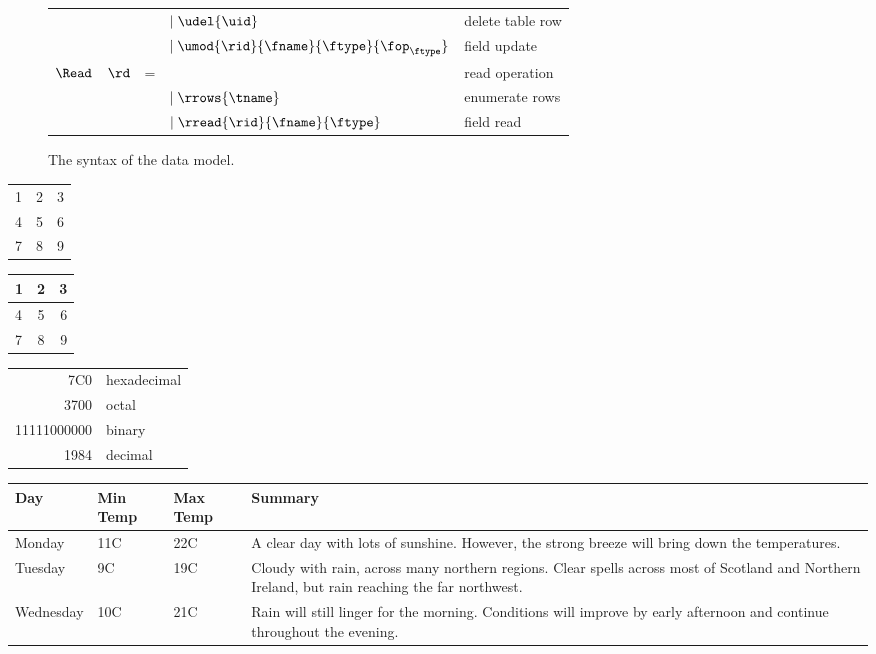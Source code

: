 \begin{figure*}
\begin{center}
\begin{tabular}{lrl@{\hspace{.1in}}l@{\hspace{.1in}}l}
  &   &  & $ \mid \udel{\uid}                    $  & delete table row \\
  &   &  & $\mid \umod{\rid}{\fname}{\ftype}{\fop_\ftype}      $  & field update \\\hline
$\Read$&$\rd$ & =    &                              & read operation \\
  &  &   & $\mid \rrows{\tname}        $           & enumerate rows \\
  &   &  & $\mid \rread {\rid}{\fname}{\ftype} $      & field read  \\\hline\hline
\end{tabular}
\end{center}
\caption{The syntax of the data model.}
\label{fig:datamodel}
\end{figure*}

\begin{tabular}{ l c r }
  1 & 2 & 3 \\
  4 & 5 & 6 \\
  7 & 8 & 9 \\
\end{tabular}

\begin{center}
  \begin{tabular}{ l | c || r }
    \hline
    1 & 2 & 3 \\ \hline
    4 & 5 & 6 \\ \hline
    7 & 8 & 9 \\
    \hline
  \end{tabular}
\end{center}

\begin{tabular}{|r|l|}
  \hline
  7C0 & hexadecimal \\
  3700 & octal \\ \cline{2-2}
  11111000000 & binary \\
  \hline \hline
  1984 & decimal \\
  \hline
\end{tabular}


\begin{center}
    \begin{tabular}{| l | l | l | l |}
    \hline
    Day & Min Temp & Max Temp & Summary \\ \hline
    Monday & 11C & 22C & A clear day with lots of sunshine.
    However, the strong breeze will bring down the temperatures. \\ \hline
    Tuesday & 9C & 19C & Cloudy with rain, across many northern regions. Clear spells
    across most of Scotland and Northern Ireland,
    but rain reaching the far northwest. \\ \hline
    Wednesday & 10C & 21C & Rain will still linger for the morning.
    Conditions will improve by early afternoon and continue
    throughout the evening. \\
    \hline
    \end{tabular}
\end{center}


